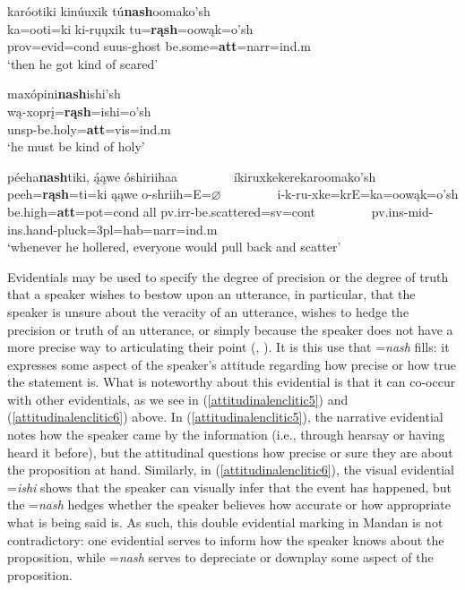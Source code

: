 \begin{exe}
\begin{xlist}
	\item\label{attitudinalenclitic5}
	\glll karóotiki kinúuxik tú\textbf{nash}oomako'sh\\
	ka=ooti=ki ki-rųųxik tu=\textbf{rąsh}=oowąk=o'sh\\
	prov=evid=cond suus-\textnormal{ghost} \textnormal{be.some}=\textbf{att}=narr=ind.m\\
	\glt `then he got kind of scared' \citep[71]{hollow1973b}
	
	\item\label{attitudinalenclitic6}
	\glll maxópini\textbf{nash}ishi'sh\\
	wą-xoprį=\textbf{rąsh}=ishi=o'sh\\
	unsp-\textnormal{be.holy}=\textbf{att}=vis=ind.m\\
	\glt `he must be kind of holy' \citep[313]{hollow1973b}

	\item\label{attitudinalenclitic7}
	\glll péeha\textbf{nash}tiki, ą́ąwe óshiriihaa ~ ~ ~ ~ ~  íkiruxkekerekaroomako'sh\\
	peeh=\textbf{rąsh}=ti=ki ąąwe o-shriih=E=$\varnothing$ ~ ~ ~ ~ ~  i-k-ru-xke=krE=ka=oowąk=o'sh\\
	\textnormal{be.high}=\textbf{att}=pot=cond \textnormal{all} pv.irr-\textnormal{be.scattered}=sv=cont ~ ~ ~ ~ ~  pv.ins-mid-ins.hand-\textnormal{pluck}=3pl=hab=narr=ind.m\\
	\glt `whenever he hollered, everyone would pull back and scatter' \citep[45]{hollow1973a}
	
	\end{xlist}

\end{exe}

Evidentials may be used to specify the degree of precision or the degree of truth that a speaker wishes to bestow upon an utterance, in particular, that the speaker is unsure about the veracity of an utterance, wishes to hedge the precision or truth of an utterance, or simply because the speaker does not have a more precise way to articulating their point (\citealt[90]{mithun1986}, \citealt[3]{aikhenvald2005}). It is this use that =\textit{nash} fills: it expresses some aspect of the speaker's attitude regarding how precise or how true the statement is. What is noteworthy about this evidential is that it can co-occur with other evidentials, as we see in (\ref{attitudinalenclitic5}) and (\ref{attitudinalenclitic6}) above. In (\ref{attitudinalenclitic5}), the narrative evidential notes how the speaker came by the information (i.e., through hearsay or having heard it before), but the attitudinal questions how precise or sure they are about the proposition at hand. Similarly, in (\ref{attitudinalenclitic6}), the visual evidential =\textit{ishi} shows that the speaker can visually infer that the event has happened, but the =\textit{nash} hedges whether the speaker believes how accurate or how appropriate what is being said is. As such, this double evidential marking in Mandan is not contradictory: one evidential serves to inform how the speaker knows about the proposition, while =\textit{nash} serves to depreciate or downplay some aspect of the proposition.

